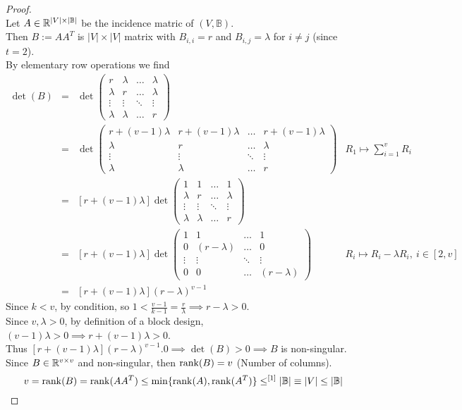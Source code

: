 \documentclass[11pt,a4paper]{article}
\begin{document}
\begin{proof}\hfill\\
Let $A\in\mathbb{R}^{|V|\times|\mathbb{B}|}$ be the incidence matric of $(V,\mathbb{B})$.\\
Then $B:=AA^T$ is $|V|\times|V|$ matrix with $B_{i,i}=r$ and $B_{i,j}=\lambda$ for $i\neq j$ (since $t=2$).\\
By elementary row operations we find
\[\begin{array}{rcl|l}
\det(B)&=&\det\begin{pmatrix}r&\lambda&\dots&\lambda\\\lambda&r&\dots&\lambda\\\vdots&\vdots&\ddots&\vdots\\\lambda&\lambda&\dots&r\end{pmatrix}\\
&=&\det\begin{pmatrix}r+(v-1)\lambda&r+(v-1)\lambda&\dots&r+(v-1)\lambda\\\lambda&r&\dots&\lambda\\\vdots&\vdots&\ddots&\vdots\\\lambda&\lambda&\dots&r\end{pmatrix}&R_1\mapsto\sum_{i=1}^vR_i\\
&=&[r+(v-1)\lambda]\det\begin{pmatrix}1&1&\dots&1\\\lambda&r&\dots&\lambda\\\vdots&\vdots&\ddots&\vdots\\\lambda&\lambda&\dots&r\end{pmatrix}\\
&=&[r+(v-1)\lambda]\det\begin{pmatrix}1&1&\dots&1\\0&(r-\lambda)&\dots&0\\\vdots&\vdots&\ddots&\vdots\\0&0&\dots&(r-\lambda)\end{pmatrix}&R_i\mapsto R_i-\lambda R_i,\ i\in[2,v]\\
&=&[r+(v-1)\lambda](r-\lambda)^{v-1}
\end{array}\]
Since $k<v$, by condition, so $1<\frac{v-1}{k-1}=\frac{r}{\lambda}\implies r-\lambda>0$.\\
Since $v,\lambda>0$, by definition of a block design, $(v-1)\lambda>0\implies r+(v-1)\lambda>0$.\\
Thus $[r+(v-1)\lambda](r-\lambda)^{v-1}.0\implies\det(B)>0\implies B$ is non-singular.\\
Since $B\in\mathbb{R}^{v\times v}$ and non-singular, then $\mathrm{rank}(B)=v$ (Number of columns).\\
$$v=\mathrm{rank}(B)=\mathrm{rank}(AA^T)\leq\min\{\mathrm{rank}(A),\mathrm{rank}(A^T)\}\leq^{[1]} |\mathbb{B}|\equiv |V|\leq |\mathbb{B}|$$
\end{proof}
\end{document}

